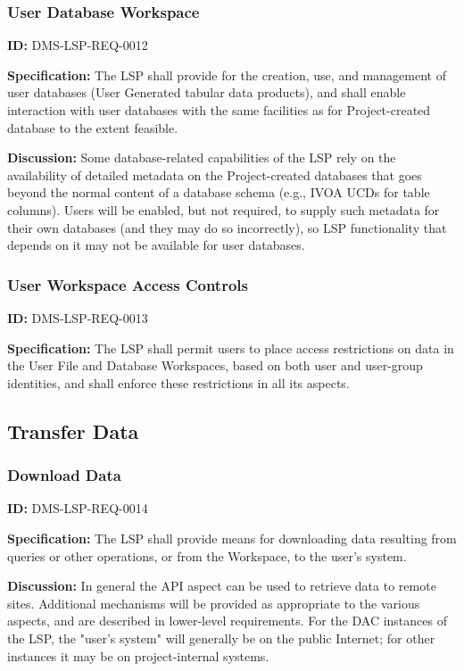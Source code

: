 \documentclass[SE,toc]{lsstdoc}
\begin{document}
\subsubsection{User Database Workspace}

\label{DMS-LSP-REQ-0012}
\textbf{ID:} DMS-LSP-REQ-0012

\textbf{Specification:}
The LSP shall provide for the creation, use, and management of user databases (User Generated tabular data products), and shall enable interaction with user databases with the same facilities as for Project-created database to the extent feasible.

\textbf{Discussion:}
Some database-related capabilities of the LSP rely on the availability of detailed metadata on the Project-created databases that goes beyond the normal content of a database schema (e.g., IVOA UCDs for table columns).  Users will be enabled, but not required, to supply such metadata for their own databases (and they may do so incorrectly), so LSP functionality that depends on it may not be available for user databases.

\subsubsection{User Workspace Access Controls}

\label{DMS-LSP-REQ-0013}
\textbf{ID:} DMS-LSP-REQ-0013

\textbf{Specification:}
The LSP shall permit users to place access restrictions on data in the User File and Database Workspaces, based on both user and user-group identities, and shall enforce these restrictions in all its aspects.

\subsection{Transfer Data}

\subsubsection{Download Data}

\label{DMS-LSP-REQ-0014}
\textbf{ID:} DMS-LSP-REQ-0014

\textbf{Specification:}
The LSP shall provide means for downloading data resulting from queries or other operations, or from the Workspace, to the user's system.

\textbf{Discussion:}
In general the API aspect can be used to retrieve data to remote sites.  Additional mechanisms will be provided as appropriate to the various aspects, and are described in lower-level requirements.  For the DAC instances of the LSP, the "user's system" will generally be on the public Internet; for other instances it may be on project-internal systems.
\end{document}
